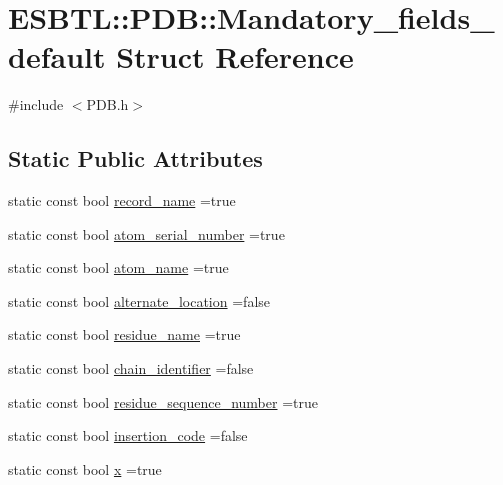 \hypertarget{structESBTL_1_1PDB_1_1Mandatory__fields__default}{}\section{E\+S\+B\+TL\+:\+:P\+DB\+:\+:Mandatory\+\_\+fields\+\_\+default Struct Reference}
\label{structESBTL_1_1PDB_1_1Mandatory__fields__default}


{\ttfamily \#include $<$P\+D\+B.\+h$>$}

\subsection*{Static Public Attributes}
\begin{DoxyCompactItemize}
\item 
static const bool \hyperlink{structESBTL_1_1PDB_1_1Mandatory__fields__default_a93a92622e8d7a1911ea1a5322e122316}{record\+\_\+name} =true
\item 
static const bool \hyperlink{structESBTL_1_1PDB_1_1Mandatory__fields__default_a7ef399cb1804a337ade5dc90ad41621d}{atom\+\_\+serial\+\_\+number} =true
\item 
static const bool \hyperlink{structESBTL_1_1PDB_1_1Mandatory__fields__default_aa2481ac2a950edb47e602bbb35a540f3}{atom\+\_\+name} =true
\item 
static const bool \hyperlink{structESBTL_1_1PDB_1_1Mandatory__fields__default_a2d59e42b7d45c283aae04065ab64ec83}{alternate\+\_\+location} =false
\item 
static const bool \hyperlink{structESBTL_1_1PDB_1_1Mandatory__fields__default_a644c65f1f95303d486d1c4a36e2cb543}{residue\+\_\+name} =true
\item 
static const bool \hyperlink{structESBTL_1_1PDB_1_1Mandatory__fields__default_a568184b9608f80a4e41f0ccf70d435ec}{chain\+\_\+identifier} =false
\item 
static const bool \hyperlink{structESBTL_1_1PDB_1_1Mandatory__fields__default_af44aa39a79e1a723475b7eb4b79b679d}{residue\+\_\+sequence\+\_\+number} =true
\item 
static const bool \hyperlink{structESBTL_1_1PDB_1_1Mandatory__fields__default_a3d7bf7d04fbd396d9c680f7b57d06ff1}{insertion\+\_\+code} =false
\item 
static const bool \hyperlink{structESBTL_1_1PDB_1_1Mandatory__fields__default_abef4da161479a87f71f86d6c1af778e0}{x} =true
\item 

\end{DoxyCompactItemize}
